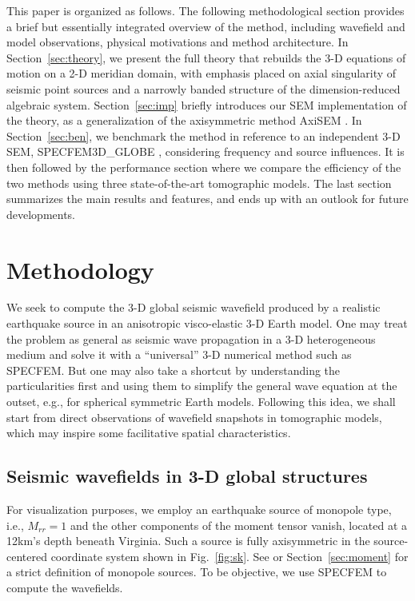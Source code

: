 \documentclass[extra]{gji}
\begin{document}

This paper is organized as follows. The following methodological section
provides a brief but essentially integrated overview of the method, 
including wavefield and model observations, physical motivations and 
method architecture. 
In Section~\ref{sec:theory}, we present the full theory that rebuilds the 
3-D equations of motion on a 2-D meridian domain, with emphasis placed on 
axial singularity of seismic point sources and a narrowly banded 
structure of the dimension-reduced algebraic system. Section~\ref{sec:imp} 
briefly introduces our SEM implementation of the theory, as a
generalization of the axisymmetric method AxiSEM \cite[]{nissen2014axisem}. 
In Section~\ref{sec:ben}, we benchmark the method in reference to
an independent 3-D SEM, SPECFEM3D\_GLOBE 
\cite[SPECFEM,][]{komatitsch2002spectralI, 
komatitsch2002spectralII}, considering frequency and source influences. 
It is then followed by the performance section where we compare the
efficiency of the two methods using three state-of-the-art tomographic models.
The last section summarizes the main results and features, and 
ends up with an outlook for future developments.  

\section{Methodology}
We seek to compute the 3-D global seismic wavefield produced by a realistic 
earthquake source in an anisotropic visco-elastic 3-D Earth model. 
One may treat the problem as general as seismic wave propagation 
in a 3-D heterogeneous medium and solve it with a ``universal'' 3-D 
numerical method such as SPECFEM. 
But one may also take a shortcut by understanding the particularities 
first and using them to simplify the general wave equation at the outset, 
e.g., \cite{nissen2007axisem} for spherical symmetric Earth models.
Following this idea, we shall start from direct observations of 
wavefield snapshots in tomographic models, which may inspire some
facilitative spatial characteristics. 

\subsection{Seismic wavefields in 3-D global structures}
\label{sec:snap}
For visualization purposes, we employ an earthquake source 
of monopole type, i.e.,
$M_{rr}=1$ and the other components of the moment tensor vanish,
located at a 12km's depth beneath Virginia. 
Such a source is fully axisymmetric in the source-centered coordinate system 
shown in Fig.~\ref{fig:sk}.
See \cite{nissen2007axisem} or Section~\ref{sec:moment} for a strict 
definition of monopole sources. 
To be objective, we use SPECFEM to compute the wavefields. 
\end{document}
